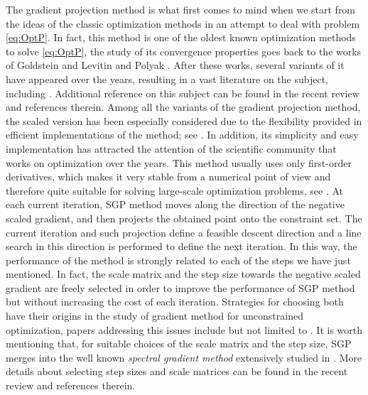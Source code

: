 The  gradient projection method   is what first comes to mind when we start from the ideas of the classic optimization methods in an attempt to deal with problem \eqref{eq:OptP}.  In fact, this  method is one of the oldest known optimization methods to solve \eqref{eq:OptP}, the study of its convergence properties goes back to the works of Goldstein \cite{Goldstein1964} and Levitin and Polyak \cite{Polyak_Levitin1966}.  After these works, several variants of it have appeared over the years, resulting in a vast literature on the subject, including  \cite{yunier_roman2010, Bertsekas1976, Bertsekas1999, Fan_Wang_Yan2019, Figueiredo2007, Gong2011,   Iusem2003, Patrascu_Necoara2018, Zhang_Wang_Yang2019}. Additional reference on this subject  can be found in the recent  review  \cite{bonettini2019recent} and  references therein. Among all the variants of the gradient projection method, the scaled  version has been especially considered due to the flexibility provided in  efficient  implementations of the method; see \cite{BirginMartinezRaydan2003,10.1093/imanum/drh020,Bonettini2016, BonettiniPrato2015, Bonettini2009}.  In addition, its simplicity and easy implementation has attracted the attention of the scientific community that works on optimization over the years.  This method usually uses only first-order derivatives, which makes it very stable from a numerical point of view and therefore quite suitable for solving large-scale optimization problems, see \cite{More1990, Nesterov_Nemirovski2013, Sra_Nowozin_Wright2012, tang_golbabaee_davies2017}. At each current iteration, SGP method  moves along the direction of the negative scaled gradient, and then projects the obtained point  onto the constraint set.  
The current iteration and such projection define a feasible descent direction and a line search in this direction is performed to define the next iteration. In this way,  the performance of the method is strongly related to each of the steps we have just  mentioned. In fact, the scale matrix and the step size towards the negative scaled gradient are freely selected in order to improve the performance  of SGP method but without increasing the cost of each iteration.  Strategies  for choosing both have  their  origins in the study of  gradient  method  for unconstrained  optimization,   papers addressing  this issues include  but not limited to \cite{BB1988, BonettiniPrato2015, DaiFletcher2006,DaiHage2006, Serafino2018, Friedlander1999, Dai2006,  DaiFletcher2005,  Polyak_Levitin1966}.   It is worth mentioning that,  for suitable choices  of the scale matrix  and the  step size,  SGP merges into the well known {\it spectral gradient method}  extensively studied in \cite{BirginMartinezRaydan2003, spgsiam}.  More details  about selecting  step sizes and scale matrices  can be found in the recent  review  \cite{bonettini2019recent} and  references therein.

